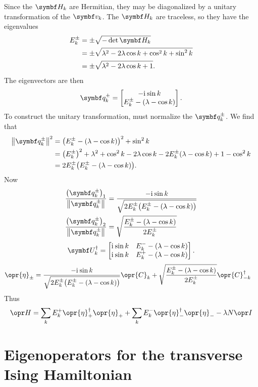 \documentclass[../thesis.tex]{subfiles}
\begin{document}
Since the $\mq{H}_k$ are Hermitian, they may be diagonalized by a unitary
transformation of the $\vq{v}_k$. The $\mq{H}_k$ are traceless, so they have the
eigenvalues
\begin{align}
  E_k^\pm
  &= \pm\sqrt{-\det\mq{H}_k} \\
  &= \pm\sqrt{\lambda^2 - 2\lambda\cos k + \cos^2 k + \sin^2 k} \\
  &= \pm\sqrt{\lambda^2 - 2\lambda\cos k + 1}.
\end{align}
The eigenvectors are then
\begin{equation}
  \vq{q}_k^\pm
  = \bmqty{%
    -\im\sin k \\
    E_k^\pm - (\lambda - \cos k)
  }.
\end{equation}
To construct the unitary transformation, must normalize the $\vq{q}_k^\pm$. We
find that
\begin{align}
  \norm{\vq{q}_k^\pm}^2
  &= {\qty(E_k^\pm - (\lambda - \cos k))}^2 + \sin^2 k \\
  &= {\qty(E_k^\pm)}^2 + \lambda^2 + \cos^2 k - 2\lambda\cos k - 2E_k^\pm(\lambda - \cos k) + 1 - \cos^2 k \\
  &= 2E_k^\pm \qty(E_k^\pm - (\lambda - \cos k)).
\end{align}
Now
\begin{align}
  \frac{{\qty(\vq{q}_k^\pm)}_1}{\norm{\vq{q}_k^\pm}}
  &= \frac{-\im\sin k}{\sqrt{2E_k^\pm \qty(E_k^\pm - (\lambda - \cos k))}} \\
  \frac{{\qty(\vq{q}_k^\pm)}_2}{\norm{\vq{q}_k^\pm}}
  &= \sqrt{\frac{E_k^\pm - (\lambda - \cos k)}{2E_k^\pm}}
\end{align}
\begin{equation}
  \mq{U}_k^\dag
  = \bmqty{%
    \im\sin k & E_k^- - (\lambda - \cos k) \\
    \im\sin k & E_k^+ - (\lambda - \cos k)
  }.
\end{equation}
\begin{align}
  \opr{\eta}_\pm
  &= \frac{-\im\sin k}{\sqrt{2E_k^\pm \qty(E_k^\pm - (\lambda - \cos k))}}
  \opr{C}_k
  + \sqrt{\frac{E_k^\pm - (\lambda - \cos k)}{2E_k^\pm}}
  \opr{C}^\dag_{-k}
\end{align}
Thus
\begin{equation}
  \ham
  = \sum_k E_k^+\opr{\eta}_+^\dag\opr{\eta}_+
  + \sum_k E_k^-\opr{\eta}_-^\dag\opr{\eta}_-
  - \lambda N \idopr
\end{equation}

\section{Eigenoperators for the transverse Ising Hamiltonian}
\end{document}
